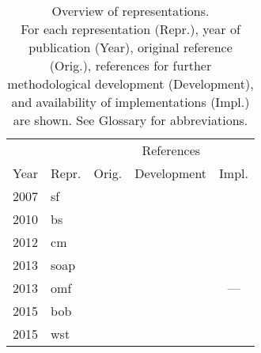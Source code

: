 \begin{table}[t]
	\caption{%
		Overview of representations.\\
		For each representation (Repr.), year of publication (Year), original reference (Orig.), references for further methodological development (Development), and availability of implementations (Impl.) are shown.
		See Glossary for abbreviations.
		\label{tab:repsr-refs}
	}
	
	\begin{center}
	\begin{tabular}{@{\hspace{2pt}}llccc@{\hspace{2pt}}}
		\toprule
		& & \multicolumn{3}{c}{References} \\ \cmidrule(lr){3-5}
		Year & Repr. & Orig.                     & Development                                                                                                    & Impl. \\ 
		\midrule
		2007 & \acs{sf}    & \cite{bp2007q}         & \cite{b2011Aq,sir2017q,gsbm2018q,rag2018q,auc2018q}                                                 & \cite{availsf,hjrf2020q}   \\
		2010 & \acs{bs}    & \cite{bpkc2010q}       & \cite{wt2018q,stt2019q,s2020q}                                                                      & \cite{availbs}                 \\
		2012 & \acs{cm}    & \cite{rtml2012Aq}       & \cite{m2012Aq,rtml2012Bq,rdrl2015q,rrl2015q,bbhm2017q}                                               & \cite{availmbtr,hjrf2020q} \\  
		2013 & \acs{soap}  & \cite{bkc2013q}        & \cite{bpkc2010q,dbcc2016q,bdcc2017q,cwc2018q,c2019Bq,jkk2019q,kme2019q,stt2019q,s2020q,kme2020q} & \cite{availsoap,hjrf2020q} \\
		2013 & \acs{omf}   & \cite{sglg2013q}     & \cite{zawg2016q,pdlg2021q}                                                                & ---                               \\
		2015 & \acs{bob}   & \cite{hbmt2015q}    & \cite{hl2016q}                                                                                       & \cite{availqml}                \\
		2015 & \acs{wst}   & \cite{hmp2017q}         & \cite{hmp2017q,eehm2017q,bsqh2018q,eemt2018q,hhnh2019q,ssqh2020q}                              & \cite{aace2020q}        \\

\end{tabular}
\end{center}
\end{table}
